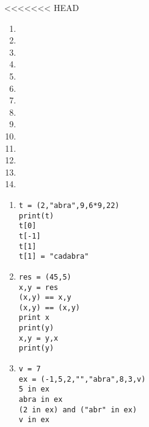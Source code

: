 <<<<<<< HEAD

\begin{multicols}{3}
  \begin{enumerate}[label=\emph{\alph*)}]
    \item {}
    \item {}
    \item {}
    \item \pyv{(,)}
    \item \pyv{()}
    \item \pyv{()+()}
    \item \pyv{()+() == ()}
    \item {}
    \item {}
    \item {}
    \item {}
    \item {}
    \item {}
    \item {}
  \end{enumerate}
\end{multicols}





\begin{enumerate}[label=\emph{\alph*)}]
\item 
\begin{lstlisting}
t = (2,"abra",9,6*9,22)
print(t)
t[0]
t[-1]
t[1]
t[1] = "cadabra" 
\end{lstlisting}
\end{enumerate}
\begin{enumerate}[label=\emph{\alph*)}]
\setcounter{enumi}{1}
\item 
\begin{lstlisting}
res = (45,5)
x,y = res
(x,y) == x,y
(x,y) == (x,y)
print x
print(y)
x,y = y,x
print(y)
\end{lstlisting}
\end{enumerate}
\begin{enumerate}[label=\emph{\alph*)}]
\setcounter{enumi}{2}
\item 
\begin{lstlisting}
v = 7
ex = (-1,5,2,"","abra",8,3,v)
5 in ex
abra in ex
(2 in ex) and ("abr" in ex)
v in ex
\end{lstlisting}
\end{enumerate}

